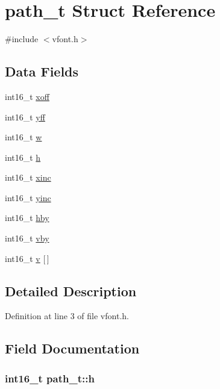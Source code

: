 \hypertarget{structpath__t}{}\section{path\+\_\+t Struct Reference}
\label{structpath__t}


{\ttfamily \#include $<$vfont.\+h$>$}

\subsection*{Data Fields}
\begin{DoxyCompactItemize}
\item 
int16\+\_\+t \hyperlink{structpath__t_afe950c04d6d3082639bd97b53f0f4b41}{xoff}
\item 
int16\+\_\+t \hyperlink{structpath__t_a208b1e1aa60b621e3632cc28d0b4f14b}{yff}
\item 
int16\+\_\+t \hyperlink{structpath__t_a8977017efd250c8fd0eb168f44c618eb}{w}
\item 
int16\+\_\+t \hyperlink{structpath__t_a02d29349ef48169495440a754cad078f}{h}
\item 
int16\+\_\+t \hyperlink{structpath__t_a88d6e591604a22ee9bd48f014fc6585c}{xinc}
\item 
int16\+\_\+t \hyperlink{structpath__t_a224367f52f511bef405c7579240f55d1}{yinc}
\item 
int16\+\_\+t \hyperlink{structpath__t_ab2a7d0842a1706edb85f5bef4300a059}{hby}
\item 
int16\+\_\+t \hyperlink{structpath__t_a3e3a916459dda0710dd252e541fbd372}{vby}
\item 
int16\+\_\+t \hyperlink{structpath__t_aea933e3d574931ef4c35386a2b2b8c03}{v} \mbox{[}$\,$\mbox{]}
\end{DoxyCompactItemize}


\subsection{Detailed Description}


Definition at line 3 of file vfont.\+h.



\subsection{Field Documentation}
\subsubsection[{\texorpdfstring{h}{h}}]{\setlength{\rightskip}{0pt plus 5cm}int16\+\_\+t path\+\_\+t\+::h}\hypertarget{structpath__t_a02d29349ef48169495440a754cad078f}{}\label{structpath__t_a02d29349ef48169495440a754cad078f}


